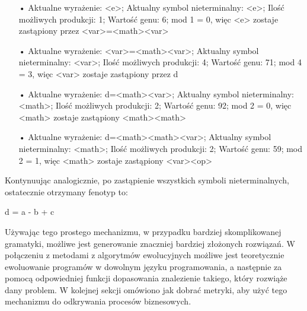 \begin{itemize}
  \item[•] Aktualne wyrażenie: <e>; \newline
Aktualny symbol nieterminalny: <e>; \newline
Ilość możliwych produkcji: 1; \newline
Wartość genu: 6;  mod 1 = 0, więc <e> zostaje zastąpiony przez <var>=<math><var>
  \item[•] Aktualne wyrażenie: <var>=<math><var>; \newline
Aktualny symbol nieterminalny: <var>; \newline
Ilość możliwych produkcji: 4; \newline
Wartość genu: 71;  mod 4 = 3, więc <var> zostaje zastąpiony przez d
  \item[•] Aktualne wyrażenie: d=<math><var>; \newline
Aktualny symbol nieterminalny: <math>; \newline
Ilość możliwych produkcji: 2; \newline
Wartość genu: 92;  mod 2 = 0, więc <math> zostaje zastąpiony <math><math>
  \item[•] Aktualne wyrażenie: d=<math><math><var>; \newline
Aktualny symbol nieterminalny: <math>; \newline
Ilość możliwych produkcji: 2; \newline
Wartość genu: 59;  mod 2 = 1, więc <math> zostaje zastąpiony <var><op>
\end{itemize}
Kontynuując analogicznie, po zastąpienie wszystkich symboli nieterminalnych, ostatecznie otrzymany fenotyp to:
\begin{center} d = a - b + c \end{center}	
Używając tego prostego mechanizmu, w przypadku bardziej skomplikowanej gramatyki, możliwe jest generowanie znaczniej bardziej złożonych rozwiązań. W połączeniu z metodami z algorytmów ewolucyjnych możliwe jest teoretycznie ewoluowanie programów w dowolnym języku programowania, a następnie za pomocą odpowiedniej funkcji dopasowania znalezienie takiego, który rozwiąże dany problem. W kolejnej sekcji omówiono jak dobrać metryki, aby użyć tego mechanizmu do odkrywania procesów biznesowych.



